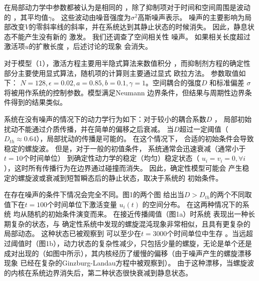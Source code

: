 \documentclass[
pdflinks,
]{xjtuthesis}
\begin{document}
\medskip
在局部动⼒学中参数都被认为是相同的
，除了抑制项对于时间和空间周围是波动的
，其平均值$\gamma$。 这些波动由噪⾳强度为$\sigma^2$⾼斯噪声表⽰。 噪声的主要影响为局部改变$V$的零斜率线的斜率，并在系统达到其静⽌状态的时候消失。 因此，静息状态不能产生没有新的
激发。 我们还调查了空间相关性
噪声。 如果相关长度超过激活项$u$的扩散长度 ，后述讨论的现象
会消失。

\medskip
对于模型（1），激活方程主要⽤半隐式算法来数值积分
，而抑制剂⽅程的确定性部分主要使用显式算法，随机项的计算则主要通过显式
欧拉⽅法。 参数取值如下： $N = 128,\epsilon = 0.02,a = 0.85,b = 0.1,\gamma = 1$。空间耦合的强度$D$ 和标准偏差
$\sigma$ 将被⽤作系统的控制参数。模型满足Neumann
边界条件，但结果与周期性边界条件得到的结果类似。

\medskip
系统在没有噪声的情况下的动力学行为如下：对于较小的耦合系数$D$ ，
局部初始扰动不能通过介质传播，并在简单的偏移之后衰减。 当$D$超过⼀定阈值（$D_{th} \approx 0.64$），局部扰动的传播是可能的。 在这个情况下，
合适的初始条件会导致稳定的螺旋波。 但是，对于⼀般的初值条件，
系统通常会迅速衰减（通常⼩于 $t = 10$个时间单位）
到确定性动⼒学的稳定（均匀）稳定状态（ $u_i = v_i = 0,\forall i$ ），这时所有传播行为在边界通过碰撞而消失。 因此，确定性模型可能会
产生稳定的螺旋波或衰减到短暂瞬态后的静⽌状态，取决于系统的
初始条件。

\medskip
在存在噪声的条件下情况会完全不同。图1的两个图
给出当$D> D_{th}$的两个不同取值下在$t = 100$个时间单位下激活变量 $u_i(t)$ 的空间分布。 在这两种情况下的系统
均从随机的初始条件演变⽽来。 在接近传播阈值（图1a）时系统
表现出⼀种长期复杂的状态，与
确定性系统中发现的螺旋混沌现象⾮常相似，且具有更复杂的局部动态。 这种状态已被观察到
可以⾄少在$ t = 3000$个时间单位中⽣存 。当远超过阈值时（图1b），动⼒状态的复杂性减少，只包括少量的螺旋，⽆论是单个还是成对出现的（如图中所⽰），其内核经历了缓慢的偏移（由于噪声产生的螺旋漂移现象
已经在复杂的Ginzburg-Landau方程中被观察到）。 由于这种漂移，当螺旋波的内核在系统边界消失后，第二种状态很快衰减到静息状态。
\end{document}
